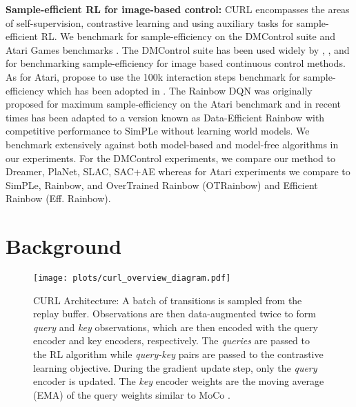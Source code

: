 \documentclass{article}
\begin{document}
{\textbf{Sample-efficient RL for image-based control:}} CURL encompasses the areas of self-supervision, contrastive learning and using auxiliary tasks for sample-efficient RL. We benchmark for sample-efficiency on the DMControl suite \citep{tassa2018deepmind} and Atari Games benchmarks \cite{bellemare2013arcade}. The DMControl suite has been used widely by \citet{yarats2019improving}, \citet{hafner2018learning}, \citet{hafner2019dream} and \citet{lee2019stochastic} for benchmarking sample-efficiency for image based continuous control methods. As for Atari, \citet{kaiser2019model} propose to use the 100k interaction steps benchmark for sample-efficiency which has been adopted in \citet{kielak2020rainbow,  van2019use}. The Rainbow DQN \cite{hessel2017rainbow} was originally proposed for maximum sample-efficiency on the Atari benchmark and in recent times has been adapted to a version known as Data-Efficient Rainbow \cite{van2019use} with competitive performance to SimPLe without learning world models. We benchmark extensively against both model-based and model-free algorithms in our experiments. For the DMControl experiments, we compare our method to Dreamer, PlaNet, SLAC, SAC+AE whereas for Atari experiments we compare to SimPLe, Rainbow, and OverTrained Rainbow (OTRainbow) and Efficient Rainbow (Eff. Rainbow).
 \vspace{-3mm}

\section{Background}




\begin{figure*}
\begin{center}
\centerline{\texttt{[image: plots/curl\_overview\_diagram.pdf]}}
\caption{CURL Architecture: A batch of transitions is sampled from the replay buffer. Observations are then data-augmented twice to form {\it query} and {\it key} observations, which are then encoded with the query encoder and key encoders, respectively. The {\it queries} are passed to the RL algorithm while {\it query-key} pairs are passed to the contrastive learning objective. During the gradient update step, only the {\it query} encoder is updated. The {\it key} encoder weights are the moving average (EMA) of the query weights similar to MoCo \cite{he2019momentum}.} 
\label{fig:curl_overview_diagram}
\vspace{-10mm}
\end{center}
\end{figure*}
\end{document}
